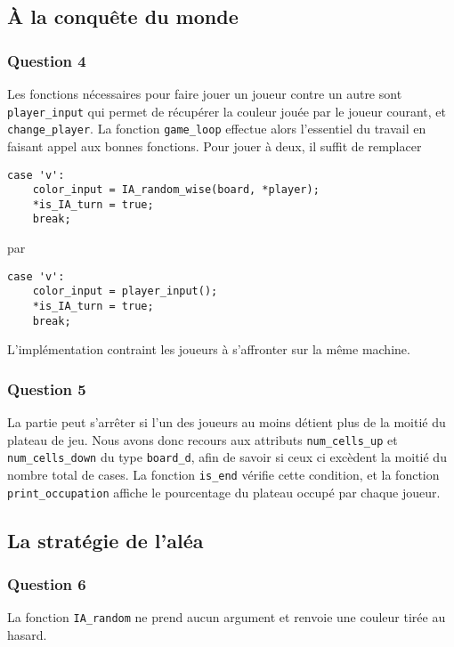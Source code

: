 \documentclass[12pt,a4paper,twoside]{article}
\begin{document}
\subsection{À la conquête du monde}
\label{sec:orgheadline12}
\subsubsection*{Question 4}
\label{sec:orgheadline10}
Les fonctions nécessaires pour faire jouer un joueur contre un autre sont
\texttt{player\_input} qui permet de récupérer la couleur jouée par le
joueur courant, et \texttt{change\_player}. La fonction
\texttt{game\_loop} effectue alors l'essentiel du travail en faisant
appel aux bonnes fonctions. Pour jouer à deux, il suffit de remplacer

\begin{lstlisting}
case 'v':
    color_input = IA_random_wise(board, *player);
    *is_IA_turn = true;
    break;
\end{lstlisting}
par 
\begin{lstlisting}
case 'v':
    color_input = player_input();
    *is_IA_turn = true;
    break;
\end{lstlisting}


L'implémentation contraint les joueurs à s'affronter sur la même
machine.

\subsubsection*{Question 5}
\label{sec:orgheadline11}
La partie peut s'arrêter si l'un des joueurs au moins détient plus de
la moitié du plateau de jeu. Nous avons donc recours aux attributs
\texttt{num\_cells\_up} et \texttt{num\_cells\_down} du type \texttt{board\_d},
afin de savoir si ceux ci excèdent la moitié du nombre total de cases.
La fonction \texttt{is\_end} vérifie cette condition, et la fonction
\texttt{print\_occupation} affiche le pourcentage du plateau occupé
par chaque joueur.

\subsection{La stratégie de l'aléa}
\label{sec:orgheadline15}
\subsubsection*{Question 6}
\label{sec:orgheadline13}
La fonction \texttt{IA\_random} ne prend aucun argument et renvoie une
couleur tirée au hasard.
\end{document}
